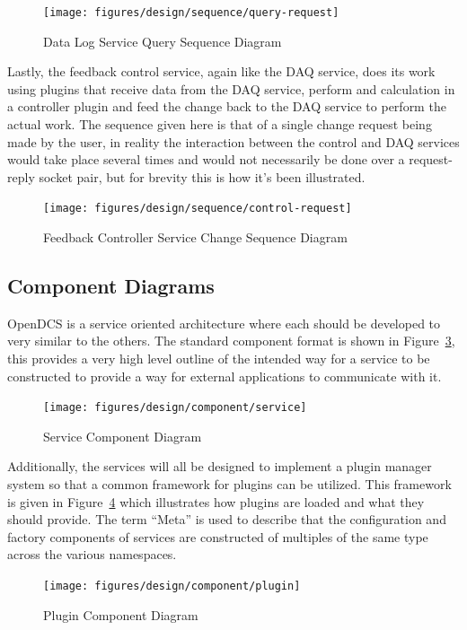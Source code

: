     \begin{figure}[H]
      \texttt{[image: figures/design/sequence/query-request]}
      \caption{Data Log Service Query Sequence Diagram}
      \label{fig:dsg-sequence-query-request}
    \end{figure}

    Lastly, the feedback control service, again like the DAQ service, does its
    work using plugins that receive data from the DAQ service, perform and
    calculation in a controller plugin and feed the change back to the DAQ
    service to perform the actual work. The sequence given here is that of a
    single change request being made by the user, in reality the interaction
    between the control and DAQ services would take place several times and
    would not necessarily be done over a request-reply socket pair, but for
    brevity this is how it's been illustrated.

    \begin{figure}[H]
      \texttt{[image: figures/design/sequence/control-request]}
      \caption{Feedback Controller Service Change Sequence Diagram}
      \label{fig:dsg-sequence-control-request}
    \end{figure}

  \subsection{Component Diagrams}\label{sec:dsg-component}

    OpenDCS is a service oriented architecture where each should be developed to
    very similar to the others. The standard component format is shown in
    Figure~\ref{fig:dsg-component-service}, this provides a very high level
    outline of the intended way for a service to be constructed to provide a way
    for external applications to communicate with it.

    \begin{figure}[H]
      \texttt{[image: figures/design/component/service]}
      \caption{Service Component Diagram}
      \label{fig:dsg-component-service}
    \end{figure}

    Additionally, the services will all be designed to implement a plugin
    manager system so that a common framework for plugins can be utilized. This
    framework is given in Figure~\ref{fig:dsg-component-plugin} which
    illustrates how plugins are loaded and what they should provide. The term
    ``Meta'' is used to describe that the configuration and factory components
    of services are constructed of multiples of the same type across the various
    namespaces.

    \begin{figure}[H]
      \texttt{[image: figures/design/component/plugin]}
      \caption{Plugin Component Diagram}
      \label{fig:dsg-component-plugin}
    \end{figure}
